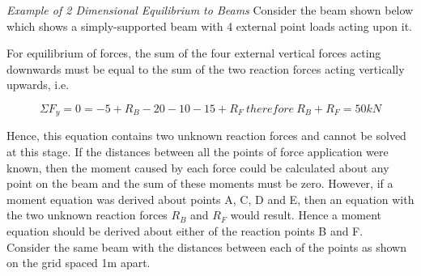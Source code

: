 \documentclass[12pt, letterpaper, twoside]{article}
\begin{document}
\bigskip

\emph{Example of 2 Dimensional Equilibrium to Beams}
Consider the beam shown below which shows a simply-supported beam with 4 external point loads acting upon it.

\bigskip

\begin{center}
\end{center}

\bigskip

For equilibrium of forces, the sum of the four external vertical forces acting downwards must be equal to the sum of the two reaction forces acting vertically upwards, i.e.

\begin{equation}
\Sigma F_y = 0 = -5 + R_B -20 - 10 - 15 + R_F \ therefore \ R_B + R_F = 50kN
\end{equation}


\bigskip

Hence, this equation contains two unknown reaction forces and cannot be solved at this stage.
If the distances between all the points of force application were known, then the moment caused by each force could be calculated about any point on the beam and the sum of these moments must be zero. However, if a moment equation was derived about points A, C, D and E, then an equation with the two unknown reaction forces $R_B$ and $R_F$ would result. Hence a moment equation should be derived about either of the reaction points B and F.\\
Consider the same beam with the distances between each of the points as shown on the grid spaced 1m apart.
\end{document}
